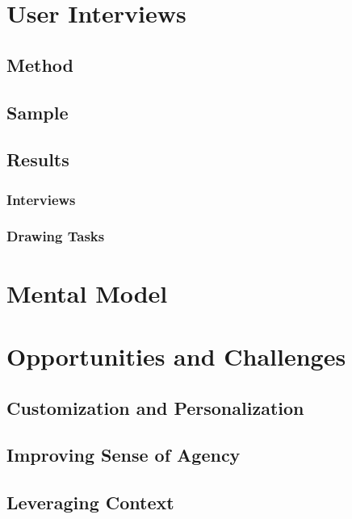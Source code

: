 \cite{Kang2015MentalModelsDrawing} \cite{BravoLillo2011WarningsMentalModel}



\section{User Interviews}

\subsection{Method}

\subsection{Sample}

\subsection{Results}

\subsubsection{Interviews}
\subsubsection{Drawing Tasks}


\section{Mental Model}


\section{Opportunities and Challenges}

\subsection{Customization and Personalization}

\subsection{Improving Sense of Agency}

\subsection{Leveraging Context}


